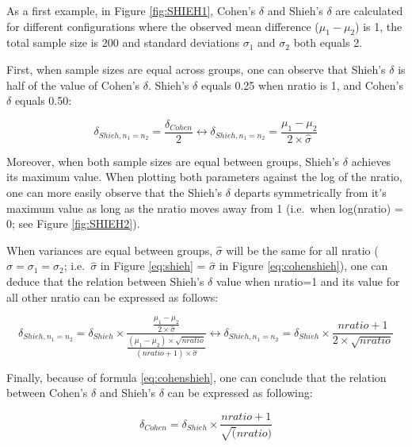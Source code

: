 \documentclass[man]{apa6}
\begin{document}
As a first example, in Figure \ref{fig:SHIEH1}, Cohen's \(\delta\) and Shieh's \(\delta\) are calculated for different configurations where the observed mean difference (\(\mu_{1}-\mu_{2}\)) is 1, the total sample size is 200 and standard deviations \(\sigma_{1}\) and \(\sigma_{2}\) both equals 2.

First, when sample sizes are equal across groups, one can observe that Shieh's \(\delta\) is half of the value of Cohen's \(\delta\). Shieh's \(\delta\) equals 0.25 when nratio is 1, and Cohen's \(\delta\) equals 0.50:

\begin{equation} 
\delta_{Shieh,n_1=n_2} = \frac{\delta_{Cohen}}{2}
\leftrightarrow \delta_{Shieh,n_1=n_2}= \frac{\mu_1-\mu_2}{2 \times \hat{\sigma}} 
\label{eq:cohenshieh}
\end{equation}

Moreover, when both sample sizes are equal between groups, Shieh's \(\delta\) achieves its maximum value. When plotting both parameters against the log of the nratio, one can more easily observe that the Shieh's \(\delta\) departs symmetrically from it's maximum value as long as the nratio moves away from 1 (i.e.~when log(nratio) = 0; see Figure \ref{fig:SHIEH2}).

When variances are equal between groups, \(\hat{\sigma}\) will be the same for all nratio (\(\hat{\sigma}=\sigma_1=\sigma_2\); i.e.~\(\hat{\sigma}\) in Figure \ref{eq:shieh} = \(\hat{\sigma}\) in Figure \ref{eq:cohenshieh}), one can deduce that the relation between Shieh's \(\delta\) value when nratio=1 and its value for all other nratio can be expressed as follows:

\begin{equation} 
\delta_{Shieh,n_1=n_2}= \delta_{Shieh} \times \frac{\frac{\mu_1-\mu_2}{2 \times \hat{\sigma}}}{\frac{(\mu_1-\mu_2) \times \sqrt{nratio}}{(nratio+1) \times \hat{\sigma}}}
\leftrightarrow \delta_{Shieh,n_1=n_2}= \delta_{Shieh} \times \frac{nratio+1}{2 \times \sqrt{nratio}}
\label{eq:shiehvsmax}
\end{equation}

Finally, because of formula \ref{eq:cohenshieh}, one can conclude that the relation between Cohen's \(\delta\) and Shieh's \(\delta\) can be expressed as following:

\begin{equation} 
\delta_{Cohen}= \delta_{Shieh} \times \frac{nratio+1}{\sqrt(nratio)}
\label{eq:shiehvsmax}
\end{equation}
\end{document}
